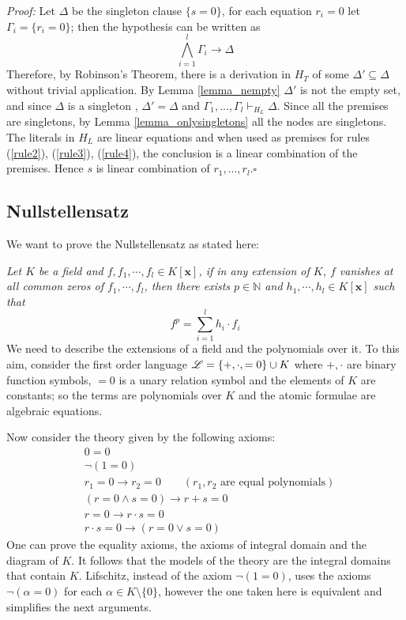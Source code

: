 \documentclass[a4paper,12pt,oneside]{book}
\newcommand*{\QED}{\hfill\ensuremath{\square}}
\let\o\vee
\let\e\wedge
\begin{document}
\textit{Proof:} Let $\Delta$ be the singleton clause $\{s=0\}$, for each equation $r_i=0$  let $\Gamma_i=\{r_i=0\}$; then the hypothesis can be written as
$$ \bigwedge_{i=1}^l \Gamma_i \rightarrow \Delta $$
Therefore, by Robinson's Theorem, there is a derivation in $H_T$ of some $\Delta' \subseteq\Delta$ without trivial application. By Lemma \ref{lemma_nempty} $\Delta'$ is not the empty set,  and  since $\Delta$ is a singleton , $\Delta'=\Delta$ and $ \Gamma_1,...,\Gamma_l \vdash_{H_L} \Delta  $.
Since all the premises are singletons, by Lemma \ref{lemma_onlysingletons} all the nodes are singletons. The literals in $H_L$ are linear equations and when used as premises for rules (\ref{rule2}), (\ref{rule3}), (\ref{rule4}), the conclusion is a linear combination of the premises. 
Hence $s$ is linear combination of $r_1,...,r_l$.\QED


\subsection*{Nullstellensatz} \label{null}


We want to prove the Nullstellensatz as stated here:

\noindent\textit{Let $K$ be a field and $f,f_1,\cdots, f_l \in K[\mathbf{x}]$, if in any extension of $K$, $f$ vanishes at all common zeros of $f_1,\cdots, f_l$, then there exists $p\in \mathbb{N}$ and $h_1,\cdots, h_l \in K[\mathbf{x}]$ such that} 
$$
f^p = \sum_{i=1}^l h_i \cdot f_i
$$
We need to describe the extensions of a field and the polynomials over it. To this aim, consider the first order language $\mathscr{L}=\{+,\cdot,=\nobreak 0\}\cup\nobreak K$ where $+,\cdot$ are binary function symbols, $=0$ is a unary relation symbol and the elements of $K$ are constants; so the terms are polynomials over $K$ and the atomic formulae are algebraic equations.

\noindent Now consider the theory given by the following axioms:
\begin{eqnarray}
& 0=0  \label{ax00} \\
& \neg (1 =0) \\
& r_1=0 \rightarrow r_2 =0 \qquad (r_1,r_2 \text{ are equal polynomials}) \\
& ( r=0 \e s=0) \rightarrow r+s=0 \\
& r=0 \rightarrow r\cdot s=0 \\
& r\cdot s=0 \rightarrow (r=0 \o s=0) \label{axintdom}
\end{eqnarray}
One can prove the equality axioms, the axioms of integral domain and the diagram of $K$. It follows that the models of the theory are the integral domains that contain $K$. Lifschitz, instead of the axiom $\neg (1=0)$, uses the axioms  $\neg (\alpha =0)$ for each $\alpha\in K\setminus \{0\}$, however the one taken here is equivalent and simplifies the next arguments.  
\end{document}
